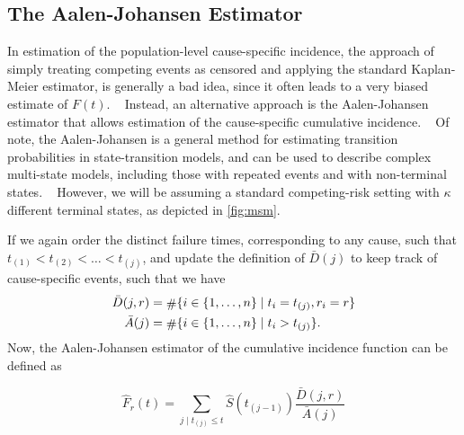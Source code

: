 \subsection{The Aalen-Johansen Estimator}

In estimation of the population-level cause-specific incidence,
the approach of simply treating competing events as censored 
and applying the standard Kaplan-Meier estimator, 
is generally a bad idea, since it often leads to a very biased estimate of 
\(F(t)\).
~\autocite{pepeKaplan1993}
Instead, an alternative approach is the Aalen-Johansen estimator
that allows estimation of the cause-specific cumulative incidence.
~\autocite{aalenEmpirical1978}
Of note, the Aalen-Johansen is a general method for estimating
transition probabilities in state-transition models,
and can be used to describe complex multi-state models,
including those with repeated events and with non-terminal states.
~\autocite{survival-package}
However, we will be assuming a standard competing-risk setting
with \(\kappa\) different terminal states, 
as depicted in \cref{fig:msm}.
 
If we again order the distinct failure times, 
corresponding to any cause, 
such that
\(t_{(1)} < t_{(2)} < \ldots < t_{(j)}\),
and update the definition of \(\bar{D}(j)\) to keep track of cause-specific
events, such that we have
\begin{equation}
\begin{aligned}
    \bar{D}(j, r) &= \card \{i \in \{1, \dots, n\} \mid t_i = t_{(j)}, r_i = r\} \\
    \bar{A}(j)    &= \card \{i \in \{1, \dots, n\} \mid t_i > t_{(j)}\}.
\end{aligned}
\end{equation}
Now, the Aalen-Johansen estimator of the cumulative incidence function
can be defined as 

\begin{equation}
    \widehat{F}_r(t)
    =   \sum_{j \mid t_{(j)} \leq t}{
        \!\!
        \widehat{S}(t_{(j-1)})
        \frac{\bar{D}(j, r)}{\bar{A}(j)}
    }
\end{equation}
